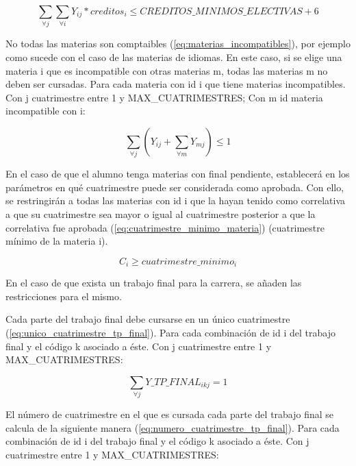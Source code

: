 \documentclass[a4paper]{article}
\begin{document}
\begin{equation}\label{eq:minimos_creditos_electivas_no_hacer_extras}
\sum_{\forall j} \sum_{\forall i} Y_{ij} * creditos_i \leq CREDITOS\_MINIMOS\_ELECTIVAS + 6
\end{equation}

No todas las materias son comptaibles (\ref{eq:materias_incompatibles}), por ejemplo como sucede con el caso de las materias de idiomas. En este caso, si se elige una materia i que es incompatible con otras materias m, todas las materias m no deben ser cursadas. Para cada materia con id i que tiene materias incompatibles. Con j cuatrimestre entre 1 y MAX\_CUATRIMESTRES; Con m id materia incompatible con i:

\begin{equation}\label{eq:materias_incompatibles}
\sum_{\forall j} (Y_{ij} + \sum_{\forall m} Y_{mj}) \leq 1
\end{equation}

En el caso de que el alumno tenga materias con final pendiente, establecerá en los parámetros en qué cuatrimestre puede ser considerada como aprobada. Con ello, se restringirán a todas las materias con id i que la hayan tenido como correlativa a que su cuatrimestre sea mayor o igual al cuatrimestre posterior a que la correlativa fue aprobada (\ref{eq:cuatrimestre_minimo_materia}) (cuatrimestre mínimo de la materia i).

\begin{equation}\label{eq:cuatrimestre_minimo_materia}
C_i \geq cuatrimestre\_minimo_i
\end{equation}

En el caso de que exista un trabajo final para la carrera, se añaden las restricciones para el mismo.

Cada parte del trabajo final debe cursarse en un único cuatrimestre (\ref{eq:unico_cuatrimestre_tp_final}). Para cada combinación de id i del trabajo final y el código k asociado a éste. Con j cuatrimestre entre 1 y MAX\_CUATRIMESTRES:

\begin{equation}\label{eq:unico_cuatrimestre_tp_final}
\sum_{\forall j} Y\_TP\_FINAL_{ikj} = 1
\end{equation}

El número de cuatrimestre en el que es cursada cada parte del trabajo final se calcula de la siguiente manera (\ref{eq:numero_cuatrimestre_tp_final}). Para cada combinación de id i del trabajo final y el código k asociado a éste. Con j cuatrimestre entre 1 y MAX\_CUATRIMESTRES:
\end{document}
